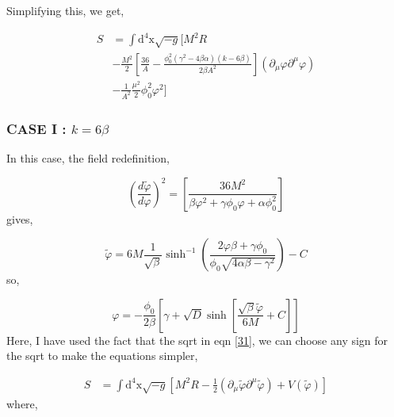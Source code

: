 \documentclass{article}
\begin{document}
Simplifying this, we get,


\begin{equation} 
    \begin{aligned}
        S &= \int \text{d}^4\text{x} \sqrt{-g} [ M^2 R \\
        &- \frac{M^2}{2} \left[\frac{36}{A} - \frac{\phi_0^2 (\gamma^2 - 4\beta\alpha)(k-6\beta)}{2\beta A^2}\right] (\partial_\mu \varphi \partial^\mu \varphi) \\
        &-  \frac{1}{A^2} \frac{\mu^2}{2} \phi^2_0 \varphi^2 ] 
    \end{aligned}
\end{equation}

\subsubsection{CASE I : $k = 6\beta$}
In this case, the field redefinition,

\begin{equation} \label{31}
    \left(\frac{d\tilde{\varphi}}{d\varphi} \right)^2 = \left[ \frac{36M^2}{\beta \varphi^2  +\gamma \phi_0 \varphi +\alpha \phi^2_0} \right]
\end{equation}
gives, 

\begin{equation}
    \tilde{\varphi} = 6M \frac{1}{\sqrt{\beta}} \sinh^{-1} \left(\frac{2\varphi\beta+\gamma\phi_0}{\phi_0 \sqrt{4\alpha\beta -\gamma^2}} \right) - C
\end{equation}
so,

\begin{equation}
    \varphi = -\frac{\phi_0}{2 \beta} \left[ \gamma + \sqrt{D}\sinh[ \frac{\sqrt{\beta }\tilde{\varphi}}{6M} + C] \right]
\end{equation}
Here, I have used the fact that the sqrt in eqn \ref{31}, we can choose any sign for the sqrt to make the equations simpler,

\begin{equation} 
    \begin{aligned}
        S &= \int \text{d}^4\text{x} \sqrt{-g} [ M^2 R - \frac{1}{2}  (\partial_\mu \tilde{\varphi} \partial^\mu \tilde{\varphi}) + V(\tilde{\varphi}) ] 
    \end{aligned}
\end{equation}
where,

\end{document}

